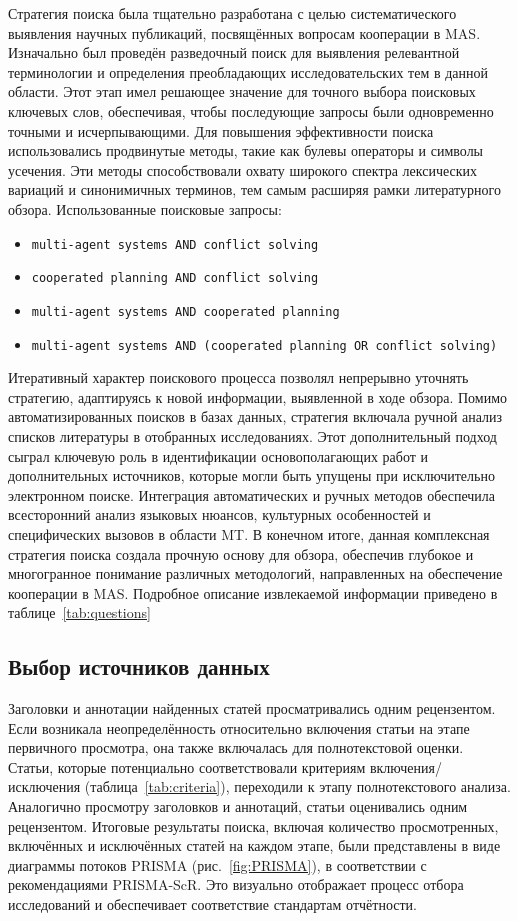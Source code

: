 Стратегия поиска была тщательно разработана с целью систематического выявления
научных публикаций, посвящённых вопросам кооперации в MAS.
Изначально был проведён разведочный поиск для выявления релевантной терминологии
и определения преобладающих исследовательских тем в данной области.
Этот этап имел решающее значение для точного выбора поисковых ключевых слов,
обеспечивая, чтобы последующие запросы были одновременно точными и исчерпывающими.
Для повышения эффективности поиска использовались продвинутые методы,
такие как булевы операторы и символы усечения.
Эти методы способствовали охвату широкого спектра лексических
вариаций и синонимичных терминов, тем самым расширяя рамки литературного обзора.
Использованные поисковые запросы:

\begin{itemize}
  \item \texttt{multi-agent systems AND conflict solving}
  \item \texttt{cooperated planning AND conflict solving}
  \item \texttt{multi-agent systems AND cooperated planning}
  \item \texttt{multi-agent systems AND (cooperated planning OR conflict solving)}
\end{itemize}

Итеративный характер поискового процесса позволял непрерывно уточнять стратегию,
адаптируясь к новой информации, выявленной в ходе обзора.
Помимо автоматизированных поисков в базах данных,
стратегия включала ручной анализ списков литературы в отобранных исследованиях.
Этот дополнительный подход сыграл ключевую роль в идентификации основополагающих работ
и дополнительных источников, которые могли быть упущены при исключительно электронном поиске.
Интеграция автоматических и ручных методов обеспечила всесторонний анализ
языковых нюансов, культурных особенностей и специфических вызовов в области MT.
В конечном итоге, данная комплексная стратегия поиска создала прочную основу для обзора,
обеспечив глубокое и многогранное понимание
различных методологий, направленных на обеспечение кооперации в MAS.
Подробное описание извлекаемой информации приведено в таблице~\ref{tab:questions}

\subsection{Выбор источников данных}

Заголовки и аннотации найденных статей просматривались одним рецензентом.
Если возникала неопределённость относительно включения статьи
на этапе первичного просмотра, она также включалась для полнотекстовой оценки.
Статьи, которые потенциально соответствовали
критериям включения/исключения (таблица~\ref{tab:criteria}),
переходили к этапу полнотекстового анализа.
Аналогично просмотру заголовков и аннотаций, статьи оценивались одним рецензентом.
Итоговые результаты поиска, включая количество просмотренных,
включённых и исключённых статей на каждом этапе,
были представлены в виде диаграммы потоков PRISMA (рис.~\ref{fig:PRISMA}),
в соответствии с рекомендациями PRISMA-ScR. Это визуально отображает
процесс отбора исследований и обеспечивает соответствие стандартам отчётности.

